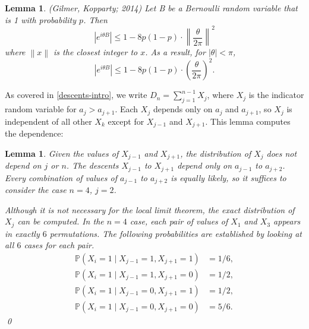 \documentclass[12pt]{article} %
\newcommand{\p}[1]{\left(#1\right)}
\newcommand{\abs}[1]{\left\lvert#1\right\rvert}
\renewcommand{\P}{\mathbb{P}}
\newcommand{\norm}[1]{\left\lVert#1\right\rVert}
\newtheorem{lem}[thm]{Lemma}
\theoremstyle{definition}
\theoremstyle{definition}
\begin{document}
\begin{lem}{(Gilmer, Kopparty; 2014)} \label{gkbound}
Let B be a Bernoulli random variable that is 1 with probability $p$. Then 
\[ \abs{e^{i\theta B}} \leq 1-8p(1-p) \cdot \left\lVert\frac{\theta}{2\pi}\right\rVert^2
\]
\noindent where $\norm{x}$ is the closest integer to $x$. As a result, for $\abs{\theta} < \pi$,
\[ \abs{e^{i\theta B}} \leq 1-8p(1-p) \cdot \p{\frac{\theta}{2\pi}}^2. \]
\end{lem}

As covered in \ref{descents-intro}, we write $D_n = \sum_{j=1}^{n-1} X_j$, where $X_j$ is the indicator random variable for $a_j > a_{j+1}$. Each $X_j$ depends only on $a_j$ and $a_{j+1}$, so $X_j$ is independent of all other $X_k$ except for $X_{j-1}$ and $X_{j+1}$. This lemma computes the dependence:
\begin{lem}
	Given the values of $X_{j-1}$ and $X_{j+1}$, the distribution of $X_j$ does not depend on $j$ or $n$.
    \proof
    The descents $X_{j-1}$ to $X_{j+1}$ depend only on $a_{j-1}$ to $a_{j+2}$. Every combination of values of $a_{j-1}$ to $a_{j+2}$ is equally likely, so it suffices to consider the case $n = 4$, $j = 2$.
    
    Although it is not necessary for the local limit theorem, the exact distribution of $X_j$ can be computed. In the $n = 4$ case, each pair of values of $X_1$ and $X_3$ appears in exactly $6$ permutations. The following probabilities are established by looking at all $6$ cases for each pair.
    \begin{align*}
		\P(X_i = 1 \mid X_{j-1} = 1, X_{j+1} = 1) &= 1/6, \\
		\P(X_i = 1 \mid X_{j-1} = 1, X_{j+1} = 0) &= 1/2, \\
		\P(X_i = 1 \mid X_{j-1} = 0, X_{j+1} = 1) &= 1/2, \\
		\P(X_i = 1 \mid X_{j-1} = 0, X_{j+1} = 0) &= 5/6.
	\end{align*}
    \qed
\end{lem}
\end{document}

